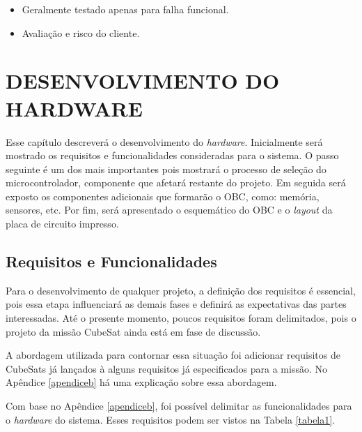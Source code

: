 \begin{itemize}
\begin{itemize}
	\item Geralmente testado apenas para falha funcional.
    \item Avaliação e risco do cliente.

	\end{itemize}
\end{itemize}


\chapter[DESENVOLVIMENTO DO HARDWARE]{DESENVOLVIMENTO DO HARDWARE}
\label{secaoHardware}
Esse capítulo descreverá o desenvolvimento do \textit{hardware}. Inicialmente será mostrado os requisitos e funcionalidades consideradas para o sistema. O passo seguinte é um dos mais importantes pois mostrará o processo de seleção do microcontrolador, componente que afetará restante do projeto. Em seguida será exposto os componentes adicionais que formarão o OBC, como: memória, sensores, etc. Por fim, será apresentado o esquemático do OBC e o \textit{layout} da placa de circuito impresso. 

\section{Requisitos e Funcionalidades}
\label{seção1_1}
Para o desenvolvimento de qualquer projeto, a definição dos requisitos é essencial, pois essa etapa influenciará as demais fases e definirá as expectativas das partes interessadas. Até o presente momento, poucos requisitos foram delimitados, pois o projeto da missão CubeSat ainda está em fase de discussão. 

A abordagem utilizada para contornar essa situação foi adicionar requisitos de CubeSats já lançados à alguns requisitos já especificados para a missão. No Apêndice \ref{apendiceb} há uma explicação sobre essa abordagem. 

Com base no Apêndice \ref{apendiceb}, foi possível delimitar as funcionalidades para o \textit{hardware} do sistema. Esses requisitos podem ser vistos na Tabela \ref{tabela1}.

